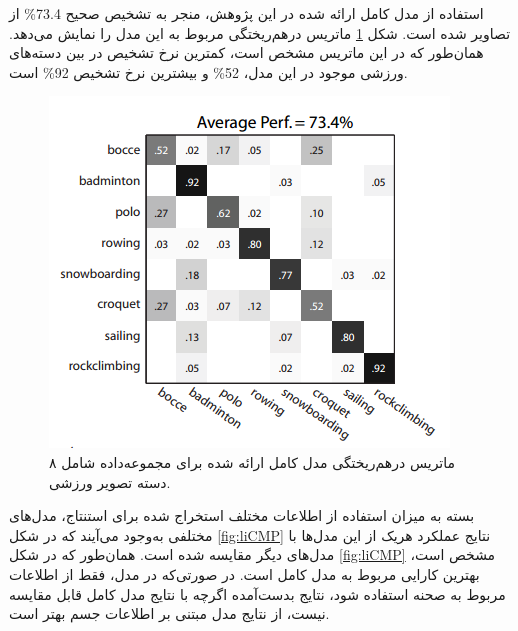 \begin{enumerate}
استفاده از مدل کامل ارائه شده در این پژوهش، منجر به تشخیص صحیح 73.4\% از تصاویر شده است. شکل
\ref{fig:liCM}
 ماتریس درهم‌ریختگی
 مربوط به این مدل را نمایش می‌دهد. همان‌طور که در این ماتریس مشخص است، کمترین نرخ تشخیص در بین دسته‌های ورزشی موجود در این مدل، 52\% و بیشترین نرخ تشخیص 92\% است.

\begin{figure}[H]
\center
\includegraphics[scale=0.8]{./Imgs/li2007and_confmat.png}
\caption{ماتریس درهم‌ریختگی مدل کامل ارائه شده برای مجموعه‌داده شامل ۸ دسته تصویر ورزشی. \cite{li2007and}}
\label{fig:liCM}
\end{figure}

بسته به میزان استفاده از اطلاعات مختلف استخراج شده برای استنتاج، مدل‌های مختلفی به‌وجود می‌آیند که در شکل
\ref{fig:liCMP}
نتایج عملکرد هریک از این مدل‌ها با مدل‌های دیگر مقایسه شده است.
همان‌طور که در شکل \ref{fig:liCMP}
مشخص است، بهترین کارایی مربوط به مدل کامل است. در صورتی‌که در مدل، فقط از اطلاعات مربوط به صحنه استفاده شود، نتایج بدست‌آمده اگرچه با نتایج مدل کامل قابل مقایسه نیست، از نتایج مدل مبتنی بر اطلاعات جسم بهتر است.


\end{enumerate}
